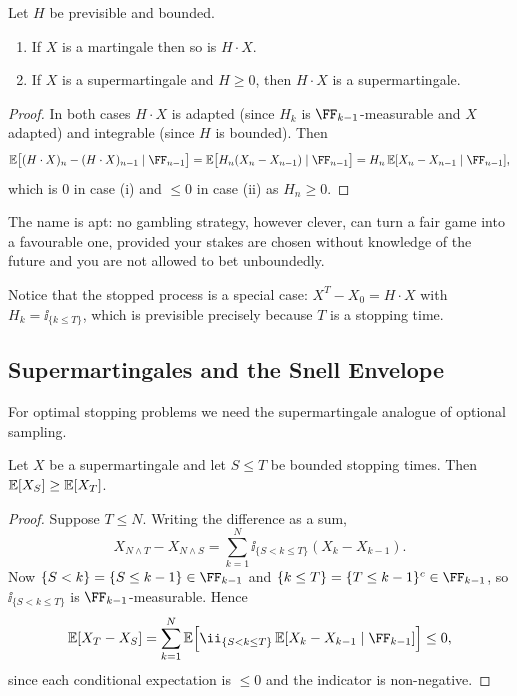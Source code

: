 \documentclass[a4paper]{scrartcl}
\begin{document}
\begin{theorem}\label{thm:transform}
	Let $H$ be previsible and bounded.
	\begin{enumerate}[label=(\roman*)]
		\item If $X$ is a martingale then so is $H \cdot X$.
		\item If $X$ is a supermartingale and $H \geq 0$, then $H\cdot X$ is a supermartingale.
	\end{enumerate}
\end{theorem}

\begin{proof}
	In both cases $H\cdot X$ is adapted (since $H_k$ is $\FF_{k-1}$-measurable and $X$ adapted) and integrable (since $H$ is bounded). Then
	$$
	\EE\big[(H\cdot X)_n - (H\cdot X)_{n-1}\mid\FF_{n-1}\big] = \EE\big[H_n(X_n-X_{n-1})\mid\FF_{n-1}\big] = H_n\,\EE[X_n - X_{n-1}\mid\FF_{n-1}],
	$$
	which is $0$ in case (i) and $\leq 0$ in case (ii) as $H_n \geq 0$.
\end{proof}

The name is apt: no gambling strategy, however clever, can turn a fair game into a favourable one, provided your stakes are chosen without knowledge of the future and you are not allowed to bet unboundedly.

Notice that the stopped process is a special case: $X^T - X_0 = H\cdot X$ with $H_k = \ii_{\{k\leq T\}}$, which is previsible precisely because $T$ is a stopping time.

\subsection{Supermartingales and the Snell Envelope}

For optimal stopping problems we need the supermartingale analogue of optional sampling.

\begin{theorem}\label{thm:oss-super}
	Let $X$ be a supermartingale and let $S \leq T$ be bounded stopping times. Then $\mathbb{E}[X_S]\geq\mathbb{E}[X_T]$.
\end{theorem}

\begin{proof}
	Suppose $T \leq N$. Writing the difference as a sum,
	$$
	X_{N\wedge T} - X_{N \wedge S} = \sum_{k=1}^{N}\ii_{\{S < k \leq T\}}(X_k - X_{k-1}).
	$$
	Now $\{S<k\} = \{S\leq k-1\}\in\FF_{k-1}$ and $\{k\leq T\} = \{T\leq k-1\}^c\in\FF_{k-1}$, so $\ii_{\{S<k\leq T\}}$ is $\FF_{k-1}$-measurable. Hence
	$$
	\EE[X_T - X_S] = \sum_{k=1}^N\EE\Big[\ii_{\{S<k\leq T\}}\,\EE[X_k - X_{k-1}\mid\FF_{k-1}]\Big] \leq 0,
	$$
	since each conditional expectation is $\leq 0$ and the indicator is non-negative.
\end{proof}
\end{document}
